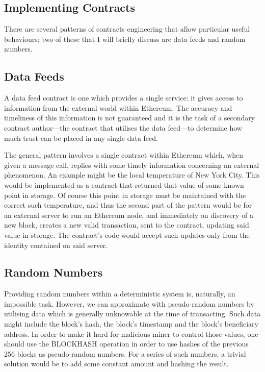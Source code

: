 \documentclass[9pt,oneside]{amsart}
\begin{document}
\begin{multicols}{2}
\section{Implementing Contracts}

There are several patterns of contracts engineering that allow particular useful behaviours; two of these that I will briefly discuss are data feeds and random numbers.

\subsection{Data Feeds}
A data feed contract is one which provides a single service: it gives access to information from the external world within Ethereum. The accuracy and timeliness of this information is not guaranteed and it is the task of a secondary contract author---the contract that utilises the data feed---to determine how much trust can be placed in any single data feed.

The general pattern involves a single contract within Ethereum which, when given a message call, replies with some timely information concerning an external phenomenon. An example might be the local temperature of New York City. This would be implemented as a contract that returned that value of some known point in storage. Of course this point in storage must be maintained with the correct such temperature, and thus the second part of the pattern would be for an external server to run an Ethereum node, and immediately on discovery of a new block, creates a new valid transaction, sent to the contract, updating said value in storage. The contract's code would accept such updates only from the identity contained on said server.

\subsection{Random Numbers}
Providing random numbers within a deterministic system is, naturally, an impossible task. However, we can approximate with pseudo-random numbers by utilising data which is generally unknowable at the time of transacting. Such data might include the block's hash, the block's timestamp and the block's beneficiary address. In order to make it hard for malicious miner to control those values, one should use the {\small BLOCKHASH} operation in order to use hashes of the previous 256 blocks as pseudo-random numbers. For a series of such numbers, a trivial solution would be to add some constant amount and hashing the result.


\end{multicols}
\end{document}
